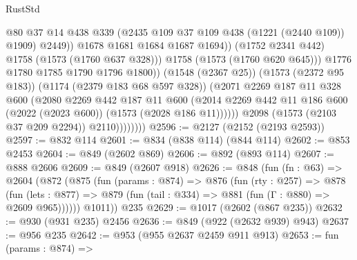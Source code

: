 \begin{lexlean}{RustStd}
\begin{coremodule}
                                      @80
                                      @37
                                      @14
                                      @438
                                      @339
                                      (@2435 @109 @37 @109 @438 (@1221 (@2440 @109)) @1909)
                                      @2449))
                                  @1678
                                  @1681
                                  @1684
                                  @1687
                                  @1694))
                              (@1752 @2341 @442)
                              @1758
                              (@1573 (@1760 @637 @328)))
                            @1758
                            (@1573 (@1760 @620 @645)))
                          @1776
                          @1780
                          @1785
                          @1790
                          @1796
                          @1800))
                      (@1548 (@2367 @25))
                      (@1573 (@2372 @95 @183))
                      (@1174 (@2379 @183 @68 @597 @328))
                      (@2071
                        @2269
                        @187
                        @11
                        @328
                        @600
                        (@2080
                          @2269
                          @442
                          @187
                          @11
                          @600
                          (@2014
                            @2269
                            @442
                            @11
                            @186
                            @600
                            (@2022 (@2023 @600))
                            (@1573 (@2028 @186 @11))))))
                    @2098
                    (@1573 (@2103 @37 @209 @2294))
                    @2110))))))))
@2596 := @2127 (@2152 (@2193 @2593))
@2597 := @832 @114
@2601 := @834 (@838 @114) (@844 @114)
@2602 := @853 @2453
@2604 := @849 (@2602 @869)
@2606 := @892 (@893 @114)
@2607 := @888 @2606
@2609 := @849 (@2607 @918)
@2626 := @848
    (fun (fn : @63) =>
    @2604
      (@872
        (@875
          (fun (params : @874) =>
          @876
            (fun (rty : @257) =>
            @878
              (fun (lets : @877) =>
              @879 (fun (tail : @334) => @881 (fun (Γ : @880) => @2609 @965))))))
        @1011))
    @235
@2629 := @1017 (@2602 (@867 @235))
@2632 := @930 (@931 @235) @2456
@2636 := @849 (@922 (@2632 @939) @943)
@2637 := @956 @235
@2642 := @953 (@955 @2637 @2459 @911 @913)
@2653 := fun (params : @874) =>

\end{coremodule}
\end{lexlean}
